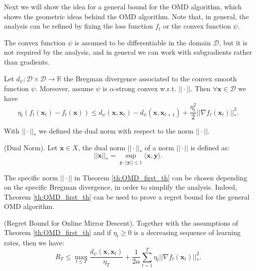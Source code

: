 Next we will show the idea for a general bound for the OMD algorithm, which shows the geometric ideas behind the OMD algorithm. Note that, in general, the analysis can be refined by fixing the loss function $f_t$ or the convex function $\psi$. 

The convex function $\psi$ is assumed to be differentiable in the domain $\mathcal D$, but it is not required by the analysis, and in general we can work with subgradients rather than gradients.   

\begin{lemma}\label{th:OMD_first_th}
Let $d_\psi:\mathcal D\times\mathcal D\to \mathbb R$ the Bregman divergence associated to the convex smooth function $\psi$. Moreover, assume $\psi$ is $\alpha$-strong convex w.r.t. $||\cdot||$.
Then $\forall \mathbf x\in\mathcal D$ we have 
$$\eta_t (f_t(\mathbf x_t)-f_t(\mathbf x))\le d_\psi(\mathbf x,\mathbf x_t)-d_\psi(\mathbf x,\mathbf x_{t+1})+\frac{\eta_t^2}{2}||\nabla f_t(\mathbf x_t)||_*^2.$$ 
\end{lemma}

With $||\cdot||_*$ we defined the dual norm with respect to the norm $||\cdot||$. 

\begin{definition}(Dual Norm).
Let $\mathbf x\in X$, the dual norm $||\cdot||_*$ of a norm $||\cdot||$ is defined as:
$$||\mathbf x||_*=\sup\limits_{\mathbf y:||\mathbf y||\le1}\langle \mathbf x,\mathbf y\rangle.$$
\end{definition}

The specific norm $||\cdot||$ in  Theorem \ref{th:OMD_first_th} can be chosen depending on the specific Bregman divergence, in order to simplify the analysis. Indeed, Theorem \ref{th:OMD_first_th} can be used to prove a regret bound for the general OMD algorithm. 

\begin{theorem}(Regret Bound for Online Mirror Descent).\label{th:regret_omd} Together with the assumptions of Theorem \ref{th:OMD_first_th} and if $\eta_t\ge0$ is a decreasing sequence of learning rates, then we have: 
$$R_T\le\max\limits_{t\le T}\frac{d_\psi(\mathbf x,\mathbf x_t)}{\eta_T}+\frac{1}{2\alpha}\sum\limits_{t=1}^T\eta_t||\nabla f_t(\mathbf x_t)||_*^2.$$
\end{theorem}


